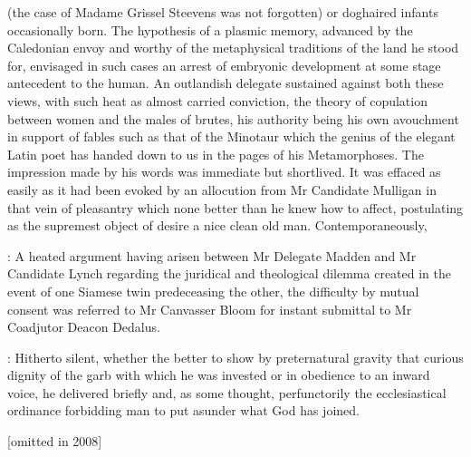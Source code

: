 (the case of Madame Grissel
Steevens was not forgotten)
or doghaired infants occasionally born.
The hypothesis of a plasmic memory,
advanced by the Caledonian envoy and
worthy of the metaphysical traditions of the land he stood for,
envisaged in such cases an arrest of embryonic development at some stage antecedent
to the human.
An outlandish delegate sustained against both these views,
with such heat as almost carried conviction,
the theory of copulation
between women and the males of brutes,
his authority being his own
avouchment in support of fables such as that of the Minotaur which the
genius of the elegant Latin poet has handed down to us in the pages of
his Metamorphoses.
The impression made by his words was immediate but
shortlived.
It was effaced as easily as it had been evoked by an
allocution from Mr Candidate Mulligan in that vein of pleasantry which
none better than he knew how to affect,
postulating as the supremest object of desire a nice clean old man.
Contemporaneously,

:
A heated argument having arisen between Mr Delegate Madden and Mr
Candidate Lynch regarding the juridical and theological dilemma created in
the event of one Siamese twin predeceasing the other,
the difficulty by
mutual consent was referred to Mr Canvasser Bloom for instant submittal to
Mr Coadjutor Deacon Dedalus.

:
Hitherto silent,
whether the better to show by preternatural gravity
that curious dignity of the garb with which he was invested or in
obedience to an inward voice,
he delivered briefly and,
as some thought,
perfunctorily the ecclesiastical ordinance forbidding man to put asunder
what God has joined.



[omitted in 2008]


